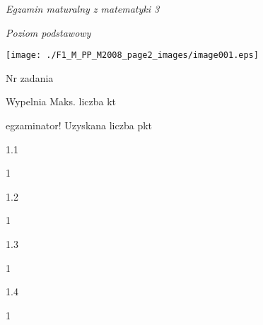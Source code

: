 \documentclass[a4paper,12pt]{article}
\begin{document}
{\it Egzamin maturalny z matematyki 3}

{\it Poziom podstawowy}
\begin{center}
\texttt{[image: ./F1\_M\_PP\_M2008\_page2\_images/image001.eps]}
\end{center}
Nr zadania

Wypelnia Maks. liczba kt

egzaminator! Uzyskana liczba pkt

1.1

1

1.2

1

1.3

1

1.4

1
\end{document}
